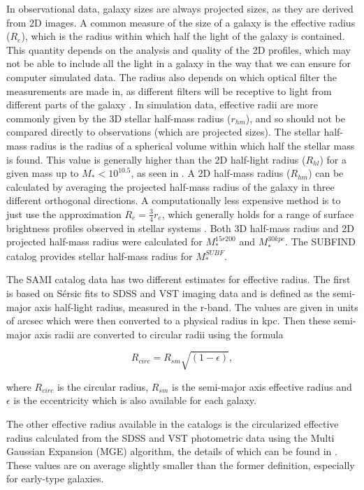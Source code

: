 In observational data, galaxy sizes are always projected sizes, as they are derived from 2D images. A common measure of the size of a galaxy is the effective radius ($R_e$), which is the radius within which half the light of the galaxy is contained. This quantity depends on the analysis and quality of the 2D profiles, which may not be able to include all the light in a galaxy in the way that we can ensure for computer simulated data. The radius also depends on which optical filter the measurements are made in, as different filters will be receptive to light from different parts of the galaxy \parencite{Sande2018}. In simulation data, effective radii are more commonly given by the 3D stellar half-mass radius ($r_{hm}$), and so should not be compared directly to observations (which are projected sizes). The stellar half-mass radius is the radius of a spherical volume within which half the stellar mass is found. This value is generally higher than the 2D half-light radius ($R_{hl}$) for a given mass up to $M_{*} < 10^{10.5}$, as seen in \textcite{Genel2017}. A 2D half-mass radius ($R_{hm}$) can be calculated by averaging the projected half-mass radius of the galaxy in three different orthogonal directions. A computationally less expensive method is to just use the approximation $R_{e} = \frac{3}{4} r_{e}$, which generally holds for a range of surface brightness profiles observed in stellar systems \parencite{Wolf2010}. Both 3D half-mass radius and 2D projected half-mass radius were calculated for $M_\ast^{15r200}$ and $M_\ast^{30kpc}$. The SUBFIND catalog provides stellar half-mass radius for $M^{SUBF}_*$.

The SAMI catalog data has two different estimates for effective radius. The first is based on Sérsic fits to SDSS and VST imaging data and is defined as the semi-major axis half-light radius, measured in the r-band. The values are given in units of arcsec which were then converted to a physical radius in kpc. Then these semi-major axis radii are converted to circular radii using the formula

\begin{equation}
   R_{circ} = R_{sm}\sqrt{(1-\epsilon)},
\end{equation}

where $R_{circ}$ is the circular radius, $R_{sm}$ is the semi-major axis effective radius and $\epsilon$ is the eccentricity which is also available for each galaxy.

The other effective radius available in the catalogs is the circularized effective radius calculated from the SDSS and VST photometric data using the Multi Gaussian Expansion (MGE) algorithm, the details of which can be found in \textcite{Scott2021}. These values are on average slightly smaller than the former definition, especially for early-type galaxies.

